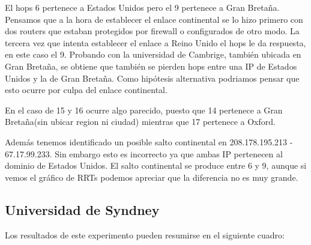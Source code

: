 El hops 6 pertenece a Estados Unidos pero el 9 pertenece a Gran Bretaña. Pensamos que a la hora de
establecer el enlace continental se lo hizo primero con dos routers que estaban protegidos por firewall o
configurados de otro modo. La tercera vez que intenta establecer el enlace a Reino Unido el hops le da
respuesta, en este caso el 9. Probando con la universidad de Cambrige, también ubicada en Gran Bretaña, se
obtiene que también se pierden hops entre una IP de Estados Unidos y la de Gran Bretaña. Como hipótesis
alternativa podriamos pensar que esto ocurre por culpa del enlace continental.%

En el caso de 15 y 16 ocurre algo parecido, puesto que 14 pertenece a Gran Bretaña(sin ubicar region
ni ciudad) mientras que 17 pertenece a Oxford.

Además tenemos identificado un posible salto continental en 208.178.195.213 - 67.17.99.233. Sin embargo esto
es incorrecto ya que ambas IP pertenecen al dominio de Estados Unidos. El salto continental se produce entre
6 y 9, aunque si vemos el gráfico de RRTs podemos apreciar que la diferencia no es muy grande.

\newpage

\subsection{Universidad de Syndney}

Los resultados de este experimento pueden resumirse en el siguiente cuadro:

